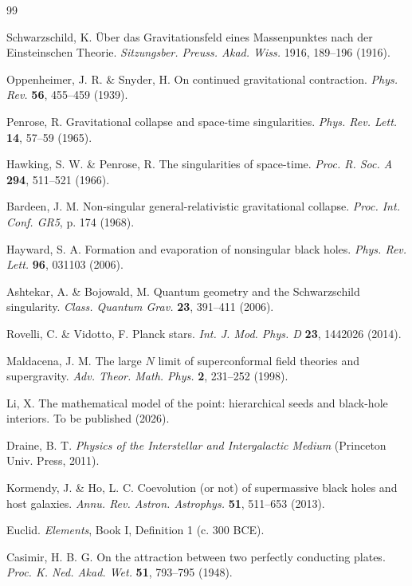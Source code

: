 \documentclass[11pt,a4paper]{article}
\begin{document}
\begin{thebibliography}{99}

Schwarzschild, K. \"Uber das Gravitationsfeld eines Massenpunktes nach der Einsteinschen Theorie. \textit{Sitzungsber. Preuss. Akad. Wiss.} 1916, 189--196 (1916).

Oppenheimer, J. R. \& Snyder, H. On continued gravitational contraction. \textit{Phys. Rev.} \textbf{56}, 455--459 (1939).

Penrose, R. Gravitational collapse and space-time singularities. \textit{Phys. Rev. Lett.} \textbf{14}, 57--59 (1965).

Hawking, S. W. \& Penrose, R. The singularities of space-time. \textit{Proc. R. Soc. A} \textbf{294}, 511--521 (1966).

Bardeen, J. M. Non-singular general-relativistic gravitational collapse. \textit{Proc. Int. Conf. GR5}, p. 174 (1968).

Hayward, S. A. Formation and evaporation of nonsingular black holes. \textit{Phys. Rev. Lett.} \textbf{96}, 031103 (2006).

Ashtekar, A. \& Bojowald, M. Quantum geometry and the Schwarzschild singularity. \textit{Class. Quantum Grav.} \textbf{23}, 391--411 (2006).

Rovelli, C. \& Vidotto, F. Planck stars. \textit{Int. J. Mod. Phys. D} \textbf{23}, 1442026 (2014).

Maldacena, J. M. The large $N$ limit of superconformal field theories and supergravity. \textit{Adv. Theor. Math. Phys.} \textbf{2}, 231--252 (1998).

Li, X. The mathematical model of the point: hierarchical seeds and black-hole interiors. To be published \url{} (2026).

Draine, B. T. \textit{Physics of the Interstellar and Intergalactic Medium} (Princeton Univ. Press, 2011).

Kormendy, J. \& Ho, L. C. Coevolution (or not) of supermassive black holes and host galaxies. \textit{Annu. Rev. Astron. Astrophys.} \textbf{51}, 511--653 (2013).

Euclid. \textit{Elements}, Book I, Definition 1 (c. 300 BCE).

Casimir, H. B. G. On the attraction between two perfectly conducting plates. \textit{Proc. K. Ned. Akad. Wet.} \textbf{51}, 793--795 (1948).


\end{thebibliography}
\end{document}

